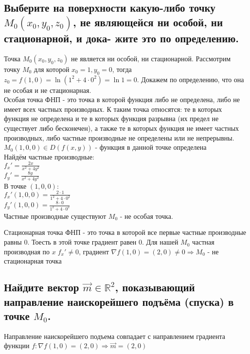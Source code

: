 \documentclass{article}
\begin{document}
    \subsection{Выберите на поверхности какую-либо точку $M_0(x_0, y_0, z_0)$, не являющейся ни особой, ни стационарной, и дока-
    жите это по определению.}
    Точка $M_0(x_0, y_0, z_0)$ не является ни особой, ни стационарной. Рассмотрим точку $M_0$ для которой $x_0 = 1, y_0 = 0$, тогда $z_0 = f(1, 0) = \ln (1^2 + 4 \cdot 0^2) = \ln 1 = 0$. Докажем по определению, что она не особая и не стационарная.\\
    Особая точка ФНП - это точка в которой функция либо не определена, либо не имеет всех частных производных. К таким точка относятся: те в которых функция не определена и те в которых функция разрывна (их предел не существует либо бесконечен), а также те в которых функция не имеет частных производных, либо частные производные не определены или не непрерывны.\\
    $M_0 (1, 0, 0) \in D(f(x, y))$ - функция в данной точке определена\\
    Найдём частные производные:\\
    $f_x'=\frac{2x}{x^2 + 4y^2}$\\
    $f_y'=\frac{8y}{x^2 + 4y^2}$\\
    В точке $(1, 0, 0):$\\
    $f_x'(1, 0, 0)=\frac{2 \cdot 1}{1^2 + 4 \cdot 0^2}$\\
    $f_y'(1, 0, 0)=\frac{8 \cdot 0}{1^2 + 4 \cdot 0^2}$\\
    Частные производные существуют \Rightarrow $M_0$ - не особая точка.

    Стационарная точка ФНП - это точка в которой все первые частные производные равны 0. Тоесть в этой точке градиент равен 0. Для нашей $M_0$ частная производная по $x \; f_x' \neq 0$, градиент $\nabla f(1, 0)=(2, 0) \neq 0 \Rightarrow M_0$ - не стационарная точка
    
    \subsection{Найдите вектор $\overrightarrow{m} \in \mathbb{R}^2$, показывающий направление наискорейшего подъёма (спуска) в точке $M_0$.}
    Направление наискорейшего подъема совпадает с направлением градиента функции $f: \nabla f(1, 0) = (2, 0) \Rightarrow \overrightarrow{m} = (2, 0)$
    
\end{document}
